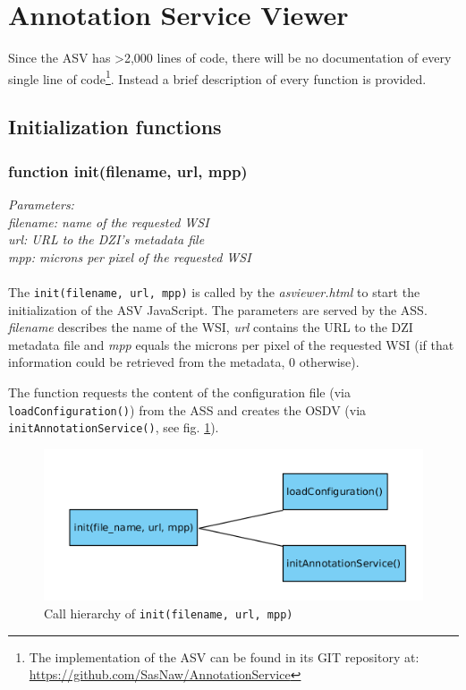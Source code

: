 \section{Annotation Service Viewer}
\label{sec_B2}
Since the ASV has \textgreater 2,000 lines of code, there will be no documentation of every single line of code\footnote{
	The implementation of the ASV can be found in its GIT repository at: \url{https://github.com/SasNaw/AnnotationService}
}. Instead a brief description of every function is provided.


\subsection{Initialization functions}

\subsubsection{function init(file{\textunderscore}name, url, mpp)}
\emph{Parameters:\\
	file{\textunderscore}name: name of the requested WSI\\
	url: URL to the DZI's metadata file\\
	mpp: microns per pixel of the requested WSI\\ \\
}
The \texttt{init(file{\textunderscore}name, url, mpp)} is called by the \emph{as{\textunderscore}viewer.html} to start the initialization of the ASV JavaScript. The parameters are served by the ASS. \emph{file{\textunderscore}name} describes the name of the WSI, \emph{url} contains the URL to the DZI metadata file and \emph{mpp} equals the microns per pixel of the requested WSI (if that information could be retrieved from the metadata, 0 otherwise).

The function requests the content of the configuration file (via \texttt{loadConfiguration()}) from the ASS and creates the OSDV (via \texttt{initAnnotationService()}, see fig. \ref{figB_init}).

\begin{figure}[H]
	\begin{center}
		\includegraphics[scale=0.5]{img/ch_init.png}
		\caption{Call hierarchy of \texttt{init(file{\textunderscore}name, url, mpp)}}
		\label{figB_init}
	\end{center}
\end{figure}


